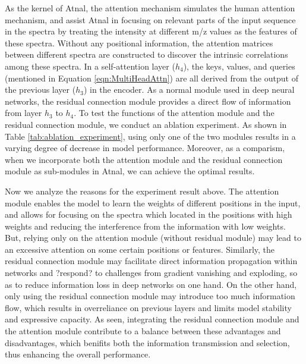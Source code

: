 \documentclass[journal=jacsat,manuscript=article]{achemso}
\begin{document}
As the kernel of Atnal, the attention mechanism simulates the human 
attention mechanism, and assist Atnal in focusing on 
relevant parts of the input sequence 
in the spectra by treating 
the intensity  
at different m/z values as the features of these spectra. Without any
positional information, the attention 
matrices between different spectra are  constructed  to discover the 
intrinsic correlations among these spectra. 
In a self-attention layer ($h_4$), the keys, values, and queries (mentioned 
in Equation \ref{eqn:MultiHeadAttn}) are all derived 
from the output of the previous layer ($h_3$) in the encoder. 
As a normal module used in deep neural networks, the residual connection module 
provides a direct flow of information from  layer $h_3$ to  $h_4$. 
To test the functions of the 
attention module and the residual connection module, we conduct an ablation experiment. 
As shown in Table \ref{tab:ablation_experiment}, 
using only one of the two modules results in a varying degree of 
decrease in model performance. 
Moreover, as a comparism, when we incorporate both the attention module and the 
residual connection module as sub-modules in Atnal, we can 
achieve the optimal results.

Now we analyze the reasons for the experiment result above. 
The attention module enables the model to learn the 
weights of different positions in the input, and allows for 
focusing on the spectra which located in the positions with high weights 
and  reducing the interference from the information with low weights. 
But, relying only 
on the attention module (without residual module) may lead 
to an excessive attention on some certain 
positions or features.
Similarly, the residual connection module may facilitate direct information 
propagation within networks and ?respond? to challenges from gradient 
vanishing and exploding, so as to reduce information loss in deep 
networks on one hand. On the other hand, only using the residual 
connection module may introduce 
too much information flow, which results in overreliance on previous 
layers and limits model stability and expressive capacity. 
As seen, integrating the residual connection module and the attention module 
contribute to a balance between these advantages and disadvantages, which benifits 
both the information transmission and selection, 
thus enhancing the overall performance.

\end{document}
